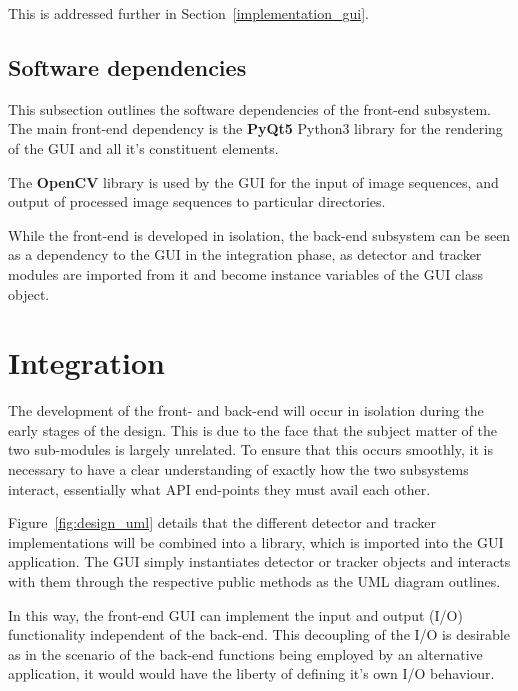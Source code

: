 This is addressed further in Section~\ref{implementation_gui}.

\subsection{Software dependencies}
This subsection outlines the software dependencies of the front-end subsystem.
The main front-end dependency is the \textbf{PyQt5} Python3 library for the
rendering of the GUI and all it's constituent elements.

The \textbf{OpenCV} library is used by the GUI for the input of image sequences,
and output of processed image sequences to particular directories.

While the front-end is developed in isolation, the back-end subsystem can be
seen as a dependency to the GUI in the integration phase, as detector and
tracker modules are imported from it and become instance variables of the GUI
class object.

\section{Integration}
The development of the front- and back-end will occur in isolation during the
early stages of the design. This is due to the face that the subject matter of
the two sub-modules is largely unrelated. To ensure that this occurs smoothly,
it is necessary to have a clear understanding of exactly how the two subsystems
interact, essentially what API end-points they must avail each other.

Figure~\ref{fig:design_uml} details that the different detector and tracker
implementations will be combined into a library, which is imported into the GUI
application.
The GUI simply instantiates detector or tracker objects and interacts with them
through the respective public methods as the UML diagram outlines.

In this way, the front-end GUI can implement the input and output (I/O) functionality
independent of the back-end. This decoupling of the I/O is desirable as in the
scenario of the back-end functions being employed by an alternative application,
it would would have the liberty of defining it's own I/O behaviour. 


